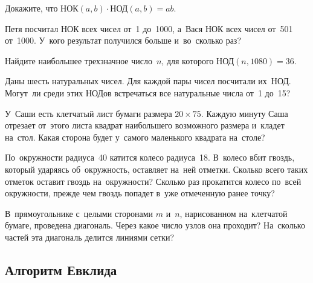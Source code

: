 \begin{problems}


\item
Докажите, что $\text{НОК}(a, b) \cdot \text{НОД}(a, b) = a b$.

\item
Петя посчитал НОК всех чисел от~1 до~1000, а~Вася НОК всех чисел от~501
от~1000.
У~кого результат получился больше и~во~сколько раз?

\item
Найдите наибольшее трехзначное число~$n$, для которого
$\text{НОД}(n, 1080) = 36$.

\item
Даны шесть натуральных чисел.
Для каждой пары чисел посчитали их~НОД.
Могут~ли среди этих НОДов встречаться все натуральные числа от~1 до~15?

\item
У~Саши есть клетчатый лист бумаги размера $20 \times 75$.
Каждую минуту Саша отрезает от~этого листа квадрат наибольшего возможного
размера и~кладет на~стол.
Какая сторона будет у~самого маленького квадрата на~столе?

\item
По~окружности радиуса~40 катится колесо радиуса~18.
В~колесо вбит гвоздь, который ударяясь об~окружность, оставляет на~ней отметки.
Сколько всего таких отметок оставит гвоздь на~окружности?
Сколько раз прокатится колесо по~всей окружности, прежде чем гвоздь попадет
в~уже отмеченную ранее точку?

\item
В~прямоугольнике с~целыми сторонами $m$ и~$n$, нарисованном на~клетчатой
бумаге, проведена диагональ.
Через какое число узлов она проходит?
На~сколько частей эта диагональ делится линиями сетки?

\end{problems}

\subsection*{Алгоритм Евклида}

